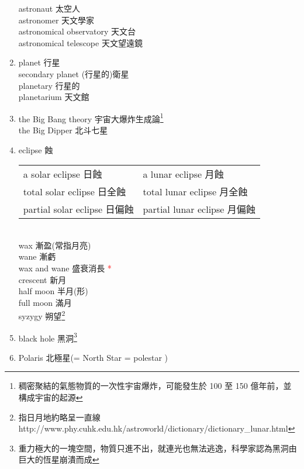 \documentclass[twoside,b5paper]{book}
\begin{document}
\begin{enumerate}
      astronaut  太空人\\
      astronomer  天文學家\\
      astronomical observatory  天文台\\
      astronomical telescope 天文望遠鏡
    \item
      planet 行星\\
      secondary planet (行星的)衛星\\
      planetary  行星的\\
      planetarium  天文館
    \item
      the Big Bang theory 宇宙大爆炸生成論\footnote{稠密聚結的氣態物質的一次性宇宙爆炸，可能發生於 100 至 150 億年前，並構成宇宙的起源}\\
      the Big Dipper 北斗七星
    \item
      eclipse  蝕\\
      \begin{tabular}[b]{|l|l|}
        a solar eclipse 日蝕          & a lunar eclipse 月蝕 \\
        total solar eclipse 日全蝕    & total lunar eclipse 月全蝕 \\
        partial solar eclipse 日偏蝕  & partial lunar eclipse 月偏蝕\\
      \end{tabular} \\
      wax 漸盈(常指月亮)\\
      wane 漸虧\\
      wax and wane 盛衰消長 \textcolor{red}{*}\\
      crescent  新月\\
      half moon 半月(形)\\
      full moon 滿月\\
      syzygy  朔望\footnote{指日月地約略呈一直線 http://www.phy.cuhk.edu.hk/astroworld/dictionary/dictionary\_{}lunar.html}
    \item
      black hole 黑洞\footnote{重力極大的一塊空間，物質只進不出，就連光也無法逃逸，科學家認為黑洞由巨大的恆星崩潰而成}
    \item
      Polaris  北極星(= North Star = polestar )\\

\end{enumerate}
\end{document}

